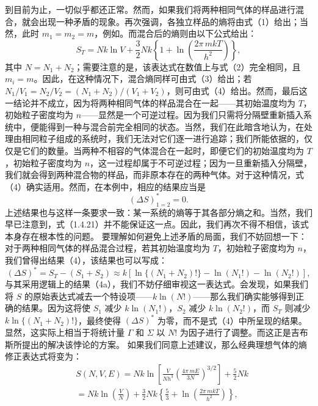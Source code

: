 到目前为止，一切似乎都还正常。然而，如果我们将两种相同气体的样品进行混合，就会出现一种矛盾的现象。再次强调，各独立样品的熵将由式（1）给出；当然，此时 \(m_{1}=m_{2}=m\)，例如。而混合后的熵则由以下公式给出：
\begin{equation}\tag{1.3.56}\label{eq:1.3.56}
S _ { T } = N k \ln V + \frac { 3 } { 2 } N k \left\{ 1 + \ln \left( \frac { 2 \pi \, m k T } { h ^{2} } \right) \right\} ,
\end{equation}
其中 \(N = N_{1} + N_{2}\)；需要注意的是，该表达式在数值上与式（2）完全相同，且 \(m_{i} = m\)。因此，在这种情况下，混合熵同样可由式（3）给出；若 \(N_{1}/V_{1} = N_{2}/V_{2} = (N_{1} + N_{2})/(V_{1} + V_{2})\)，则可由式（4）给出。然而，最后这一结论并不成立，因为将两种相同气体的样品混合在一起——其初始温度均为 \(T\)，初始粒子密度均为 \(n\)——显然是一个可逆过程。因为我们只需将分隔壁重新插入系统中，便能得到一种与混合前完全相同的状态。当然，我们在此暗含地认为，在处理由相同粒子组成的系统时，我们无法对它们逐一进行追踪；我们所能依据的，仅仅是它们的数量。当两种不相容的气体混合在一起时，即便它们的初始温度均为 \(T\)，初始粒子密度均为 \(n\)，这一过程却属于不可逆过程；因为一旦重新插入分隔壁，我们就会得到两种混合物的样品，而非原本存在的两种气体。对于这种情况，式（4）确实适用。然而，在本例中，相应的结果应当是
\begin{equation}\tag{1.3.57}\label{eq:1.3.57}
( \Delta S ) _ { 1 = 2 } ^{*} = 0 .
\end{equation}
上述结果也与这样一条要求一致：某一系统的熵等于其各部分熵之和。当然，我们早已注意到，式（1.4.21）并不能保证这一点。因此，我们再次不得不相信，该式本身存在根本性的问题。
要理解如何避免上述矛盾的局面，我们不妨回想一下：对于两种相同气体的样品混合过程，若其初始温度均为 \(T\)，初始粒子密度均为 \(n\)，我们曾得出结果（4），该结果也可以写成：
\begin{equation}\tag{1.3.58}\label{eq:1.3.58}
( \Delta S ) ^{*} = S _ { T } - ( S _ { 1 } + S _ { 2 } ) \approx k [ \ln \{ ( N _ { 1 } + N _ { 2 } ) ! \} - \ln ( N _ { 1 } ! ) - \ln ( N _ { 2 } ! ) ] ,
\end{equation}
与其采用逻辑上的结果（4a），我们不妨仔细审视这一表达式。会发现，如果我们将 \(S\) 的原始表达式减去一个特设项——\(k\ln(N!)\)——那么我们确实能够得到正确的结果。因为这将使 \(S_1\) 减少 \(k\ln(N_1!)\)，\(S_2\) 减少 \(k\ln(N_2!)\)，而 \(S_T\) 则减少 \(k\ln\{(N_1+N_2)!\}\)，最终使得 \((\Delta S)^*\) 为零，而不是式（4）中所呈现的结果。显然，这实际上相当于将统计量 \(\Gamma\) 和 \(\Sigma\) 以 \(N!\) 为因子进行了调整。而这正是吉布斯所提出的解决该悖论的方案。
如果我们同意上述建议，那么经典理想气体的熵修正表达式将变为：
\begin{equation}\tag{1.3.59}\label{eq:1.3.59}
\begin{array}{rl} & { S ( N , V , E ) = N k \ln \left[ \frac { V } { N h ^{3} } \left( \frac { 4 \pi \, m E } { 3 N } \right) ^{3 / 2} \right] + \frac { 5 } { 2 } N k } \\& {  = N k \ln \left( \frac { V } { N } \right) + \frac { 3 } { 2 } N k \left\{ \frac { 5 } { 3 } + \ln \left( \frac { 2 \pi \, m k T } { h ^{2} } \right) \right\} , } \end{array}
\end{equation}
